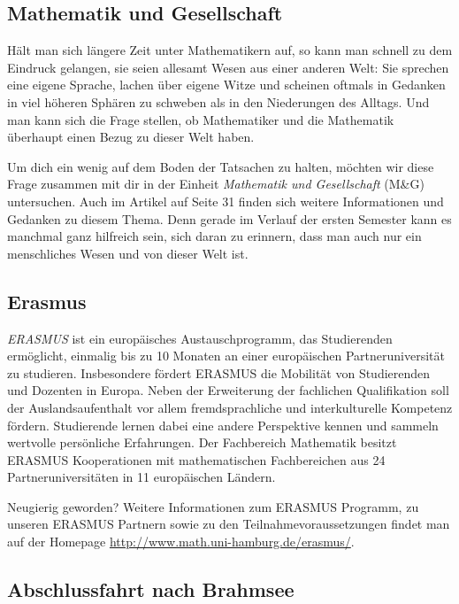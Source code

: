 \subsection*{Mathematik und Gesellschaft}

Hält man sich längere Zeit unter Mathematikern auf, so kann man schnell zu dem
Eindruck gelangen, sie seien allesamt Wesen aus einer anderen Welt: Sie
sprechen eine eigene Sprache, lachen über eigene Witze und scheinen oftmals in
Gedanken in viel höheren Sphären zu schweben als in den Niederungen des
Alltags.  Und man kann sich die Frage stellen, ob Mathematiker und die
Mathematik überhaupt einen Bezug zu dieser Welt haben.


Um dich ein wenig auf dem Boden der Tatsachen zu halten, möchten wir diese
Frage zusammen mit dir in der Einheit \emph{Mathematik und Gesellschaft} (M\&G)
untersuchen. Auch im Artikel auf Seite 31 finden sich weitere Informationen und
Gedanken zu diesem Thema. Denn gerade im Verlauf der ersten Semester kann es
manchmal ganz hilfreich sein, sich daran zu erinnern, dass man auch nur ein
menschliches Wesen und von dieser Welt ist.

\subsection{Erasmus}


\emph{ERASMUS} ist ein europäisches Austauschprogramm, das Studierenden
ermöglicht, einmalig bis zu 10 Monaten an einer europäischen Partneruniversität
zu studieren.  Insbesondere fördert ERASMUS die Mobilität von Studierenden und
Dozenten in Europa.  Neben der Erweiterung der fachlichen Qualifikation soll
der Auslandsaufenthalt vor allem fremdsprachliche und interkulturelle Kompetenz
fördern. Studierende lernen dabei eine andere Perspektive kennen und sammeln
wertvolle persönliche Erfahrungen.  Der Fachbereich Mathematik besitzt
ERASMUS Kooperationen mit mathematischen Fachbereichen aus 24
Partneruniversitäten in 11 europäischen Ländern.

Neugierig geworden? Weitere Informationen zum ERASMUS Programm, zu unseren
ERASMUS Partnern sowie zu den Teilnahmevoraussetzungen findet man auf der
Homepage \url{http://www.math.uni-hamburg.de/erasmus/}.

\subsection*{Abschlussfahrt nach Brahmsee}

